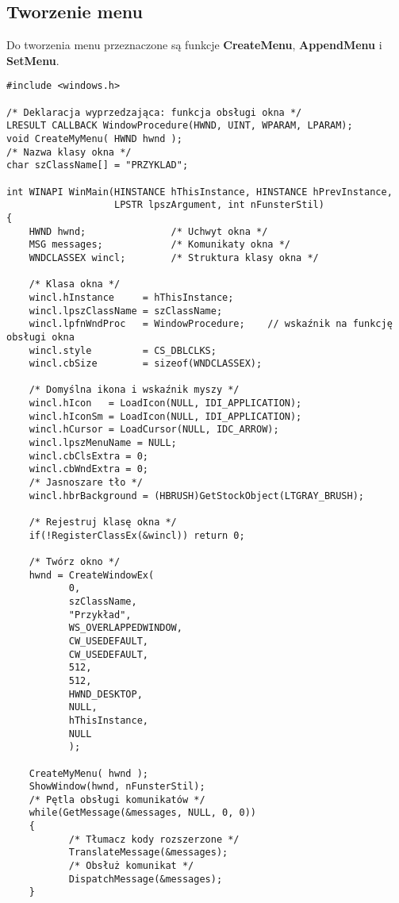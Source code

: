 ﻿\subsection{Tworzenie menu}

Do tworzenia menu przeznaczone są funkcje {\bf CreateMenu}, {\bf AppendMenu} i {\bf SetMenu}.

\begin{scriptsize}
\begin{verbatim}
#include <windows.h>

/* Deklaracja wyprzedzająca: funkcja obsługi okna */
LRESULT CALLBACK WindowProcedure(HWND, UINT, WPARAM, LPARAM);
void CreateMyMenu( HWND hwnd );
/* Nazwa klasy okna */
char szClassName[] = "PRZYKLAD";

int WINAPI WinMain(HINSTANCE hThisInstance, HINSTANCE hPrevInstance, 
                   LPSTR lpszArgument, int nFunsterStil)
{
    HWND hwnd;               /* Uchwyt okna */
    MSG messages;            /* Komunikaty okna */
    WNDCLASSEX wincl;        /* Struktura klasy okna */

    /* Klasa okna */
    wincl.hInstance     = hThisInstance;
    wincl.lpszClassName = szClassName;
    wincl.lpfnWndProc   = WindowProcedure;    // wskaźnik na funkcję obsługi okna  
    wincl.style         = CS_DBLCLKS;                 
    wincl.cbSize        = sizeof(WNDCLASSEX);

    /* Domyślna ikona i wskaźnik myszy */
    wincl.hIcon   = LoadIcon(NULL, IDI_APPLICATION);
    wincl.hIconSm = LoadIcon(NULL, IDI_APPLICATION);
    wincl.hCursor = LoadCursor(NULL, IDC_ARROW);
    wincl.lpszMenuName = NULL; 
    wincl.cbClsExtra = 0;   
    wincl.cbWndExtra = 0;   
    /* Jasnoszare tło */
    wincl.hbrBackground = (HBRUSH)GetStockObject(LTGRAY_BRUSH);

    /* Rejestruj klasę okna */
    if(!RegisterClassEx(&wincl)) return 0;

    /* Twórz okno */
    hwnd = CreateWindowEx(
           0,                   
           szClassName,         
           "Przykład",       
           WS_OVERLAPPEDWINDOW, 
           CW_USEDEFAULT,       
           CW_USEDEFAULT,       
           512,                 
           512,                 
           HWND_DESKTOP,        
           NULL,                
           hThisInstance,       
           NULL                 
           );

    CreateMyMenu( hwnd );
    ShowWindow(hwnd, nFunsterStil);
    /* Pętla obsługi komunikatów */
    while(GetMessage(&messages, NULL, 0, 0))
    {
           /* Tłumacz kody rozszerzone */
           TranslateMessage(&messages);
           /* Obsłuż komunikat */
           DispatchMessage(&messages);
    }


\end{verbatim}
\end{scriptsize}
